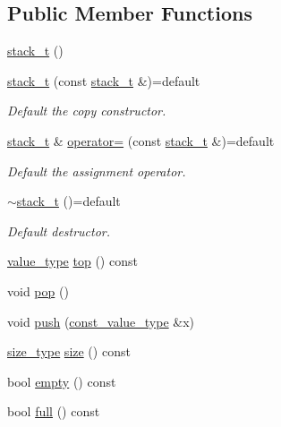 \subsection*{Public Member Functions}
\begin{DoxyCompactItemize}
\item 
\hyperlink{classstk_1_1stack__t_ab7605ffb3efbfdaf23c1411dba8076d7}{stack\+\_\+t} ()
\item 
\mbox{\label{classstk_1_1stack__t_a27abcc49011f8cd22cd92395655f8ca4}} 
\hyperlink{classstk_1_1stack__t_a27abcc49011f8cd22cd92395655f8ca4}{stack\+\_\+t} (const \hyperlink{classstk_1_1stack__t}{stack\+\_\+t} \&)=default
\begin{DoxyCompactList}\small\item\em Default the copy constructor. \end{DoxyCompactList}\item 
\mbox{\label{classstk_1_1stack__t_a680884feaecd4cb19ea890893c583fdb}} 
\hyperlink{classstk_1_1stack__t}{stack\+\_\+t} \& \hyperlink{classstk_1_1stack__t_a680884feaecd4cb19ea890893c583fdb}{operator=} (const \hyperlink{classstk_1_1stack__t}{stack\+\_\+t} \&)=default
\begin{DoxyCompactList}\small\item\em Default the assignment operator. \end{DoxyCompactList}\item 
\mbox{\label{classstk_1_1stack__t_acd6dfd6efc2edad5c9bd8f126c415a69}} 
\hyperlink{classstk_1_1stack__t_acd6dfd6efc2edad5c9bd8f126c415a69}{$\sim$stack\+\_\+t} ()=default
\begin{DoxyCompactList}\small\item\em Default destructor. \end{DoxyCompactList}\item 
\hyperlink{classstk_1_1stack__t_a05d1586fa8257268f0c1ade7ffc4588e}{value\+\_\+type} \hyperlink{classstk_1_1stack__t_a4c8dca98c8f18b9d60398ac75aba5af7}{top} () const
\item 
void \hyperlink{classstk_1_1stack__t_a5be99b150a46b8456643cbc40bcefca8}{pop} ()
\item 
void \hyperlink{classstk_1_1stack__t_aad7638faa441f17e91ba9a8f5663be4c}{push} (\hyperlink{classstk_1_1stack__t_a27d586bc06e0faf30a2a980cd8ffd125}{const\+\_\+value\+\_\+type} \&x)
\item 
\hyperlink{classstk_1_1stack__t_ade199c494a8e4455f76cc04faf138ed8}{size\+\_\+type} \hyperlink{classstk_1_1stack__t_a50dbd2e6626510af69ba1f38882ca1b5}{size} () const
\item 
bool \hyperlink{classstk_1_1stack__t_adb144d5de96aeeed6dee8d902158f1a6}{empty} () const
\item 
bool \hyperlink{classstk_1_1stack__t_a62b9e32ef2b123939b4c21175b5fc036}{full} () const
\end{DoxyCompactItemize}
